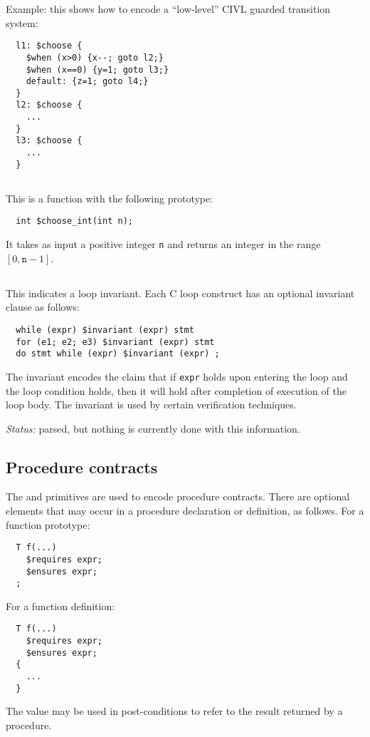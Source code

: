 \documentclass[11pt]{book}
\begin{document}
Example: this shows how to encode a ``low-level'' CIVL guarded
transition system:

\begin{verbatim}
  l1: $choose {
    $when (x>0) {x--; goto l2;}
    $when (x==0) {y=1; goto l3;}
    default: {z=1; goto l4;}
  }
  l2: $choose {
    ...
  }
  l3: $choose {
    ...
  }
\end{verbatim}

\subsection{\cchooseint} This is a function with the following prototype:
\begin{verbatim}
  int $choose_int(int n);
\end{verbatim}
It takes as input a positive integer \texttt{n} and returns an integer
in the range $[0,\texttt{n}-1]$.  

\subsection{\cinvariant} This indicates a loop invariant.  Each C loop
construct has an optional invariant clause as follows:
\begin{verbatim}
  while (expr) $invariant (expr) stmt
  for (e1; e2; e3) $invariant (expr) stmt
  do stmt while (expr) $invariant (expr) ;
\end{verbatim}
The invariant encodes the claim that if \texttt{expr} holds upon
entering the loop and the loop condition holds, then it will hold
after completion of execution of the loop body.  The invariant is used
by certain verification techniques.

\emph{Status:} parsed, but nothing is currently done with this
information.

\subsection{Procedure contracts}
The \crequires{} and \censures{} primitives are used to encode
procedure contracts.  There are optional
elements that may occur in a procedure declaration or definition,
as follows.  For a function prototype:
\begin{verbatim}
  T f(...)
    $requires expr;
    $ensures expr;
  ;
\end{verbatim}
For a function definition:
\begin{verbatim}
  T f(...)
    $requires expr;
    $ensures expr;
  {
    ...
  }
\end{verbatim}
The value \cresult{} may be used in post-conditions to refer
to the result returned by a procedure.
\end{document}
